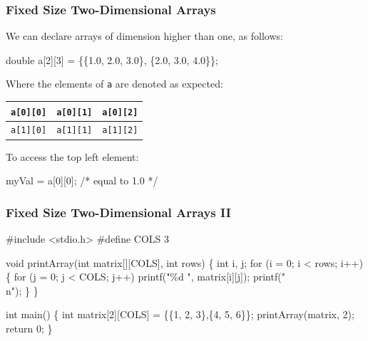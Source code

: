 \documentclass[table]{beamer}
\newif\ifschigh\schighfalse
\newcommand{\kw}[1]{\ifschigh\textcolor{red}{#1}\else\textcolor{keyword}{#1}\fi}
\newcommand{\kt}[1]{\ifschigh\textcolor{red}{#1}\else\textcolor{ctext}{#1}\fi}
\newcommand{\kc}[1]{\ifschigh\textcolor{red}{#1}\else\textcolor{comment}{#1}\fi}
\newcounter{sckll}
\newcommand{\kr}{\setcounter{sckll}{1}}
\newcommand{\kl}{}
\begin{document}
\begin{frame}[fragile]
\frametitle{Fixed Size Two-Dimensional Arrays}
We can declare arrays of dimension higher than one, as follows:
\begin{semiverbatim}
\kw{double} a[2][3] = \{\{1.0, 2.0, 3.0\},
                  \{2.0, 3.0, 4.0\}\};
\end{semiverbatim}
Where the elements of {\tt a} are denoted as expected:
\begin{center}
\begin{tabular}{|c|c|c|}
\hline
\tt a[0][0]&\tt a[0][1]&\tt a[0][2]\\
\hline
\tt a[1][0]&\tt a[1][1]&\tt a[1][2]\\
\hline
\end{tabular}
\end{center}
To access the top left element:
\begin{semiverbatim}
myVal = a[0][0]; \kc{/* equal to 1.0 */}
\end{semiverbatim}
\end{frame}

\begin{frame}[fragile]
\frametitle{Fixed Size Two-Dimensional Arrays II}
\vspace{-0.2in}
\begin{semiverbatim}
\footnotesize
\kr\kl\kw{\#include} \kt{<stdio.h>}
\kl\kw{\#define} COLS 3
\kl
\kl\kw{void} printArray(\kw{int} matrix[][COLS], int rows)
\kl\{
\kl   \kw{int} i, j;
\kl   \kw{for} (i = 0; i < rows; i++)
\kl   \{
\kl      \kw{for} (j = 0; j < COLS; j++)
\kl         printf(\kt{"\%d "}, matrix[i][j]);    
\kl      printf(\kt{"\\n"});
\kl   \}
\kl\}
\kl
\kl\kw{int} main()
\kl\{
\kl   \kw{int} matrix[2][COLS] = \{\{1, 2, 3\},\{4, 5, 6\}\};
\kl   printArray(matrix, 2);
\kl   \kw{return} 0;
\kl\}
\end{semiverbatim}
\end{frame}
\end{document}
